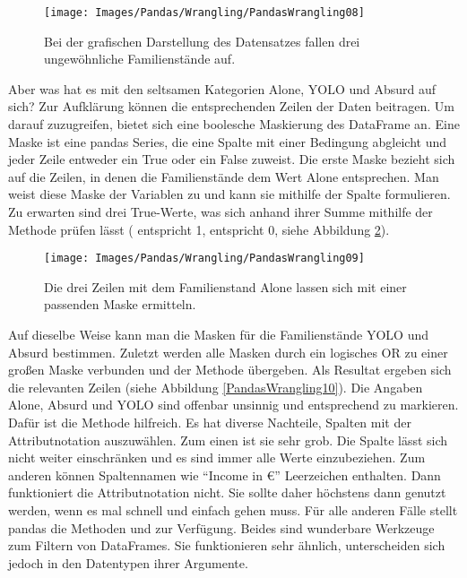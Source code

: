 \begin{figure}
    \centering
    \texttt{[image: Images/Pandas/Wrangling/PandasWrangling08]}    
    \caption{Bei der grafischen Darstellung des Datensatzes fallen drei ungewöhnliche Familienstände auf.} \label{PandasWrangling08}
\end{figure}

Aber was hat es mit den seltsamen Kategorien Alone, YOLO und Absurd auf sich? Zur Aufklärung können die entsprechenden Zeilen der Daten beitragen. Um darauf zuzugreifen, bietet sich eine boolesche Maskierung des DataFrame an. Eine Maske ist eine pandas Series, die eine Spalte mit einer Bedingung abgleicht und jeder Zeile entweder ein True oder ein False zuweist. Die erste Maske bezieht sich auf die Zeilen, in denen die Familienstände dem Wert Alone entsprechen. Man weist diese Maske der Variablen  zu und kann sie mithilfe der Spalte  formulieren. Zu erwarten sind drei True-Werte, was sich anhand ihrer Summe mithilfe der Methode  prüfen lässt ( entspricht 1,  entspricht 0, siehe Abbildung \ref{PandasWrangling09}).

\begin{figure}
    \centering
    \texttt{[image: Images/Pandas/Wrangling/PandasWrangling09]}    
    \caption{Die drei Zeilen mit dem Familienstand Alone lassen sich mit einer passenden Maske ermitteln.} \label{PandasWrangling09}
\end{figure}

Auf dieselbe Weise kann man die Masken für die Familienstände YOLO und Absurd bestimmen. Zuletzt werden alle Masken durch ein logisches OR zu einer großen Maske verbunden und der Methode  übergeben. Als Resultat ergeben sich die relevanten Zeilen (siehe Abbildung \ref{PandasWrangling10}). Die Angaben Alone, Absurd und YOLO sind offenbar unsinnig und entsprechend zu markieren. Dafür ist die Methode  hilfreich. Es hat diverse Nachteile, Spalten mit der Attributnotation auszuwählen. Zum einen ist sie sehr grob. Die Spalte lässt sich nicht weiter einschränken und es sind immer alle Werte einzubeziehen. Zum anderen können Spaltennamen wie ``Income in \euro{}'' Leerzeichen enthalten. Dann funktioniert die Attributnotation nicht. Sie sollte daher höchstens dann genutzt werden, wenn es mal schnell und einfach gehen muss. Für alle anderen Fälle stellt pandas die Methoden  und  zur Verfügung. Beides sind wunderbare Werkzeuge zum Filtern von DataFrames. Sie funktionieren sehr ähnlich, unterscheiden sich jedoch in den Datentypen ihrer Argumente.

